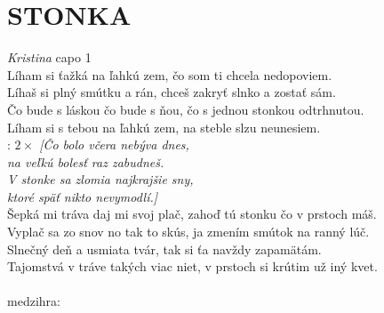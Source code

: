 \section*{\Huge STONKA}
\emph{Kristina} \hspace{12cm} capo 1\\

Líham si ťažká na ľahkú zem, 
čo som ti chcela nedopoviem.\\
Líhaš si plný smútku a rán, 
chceš zakryť slnko a zostať sám.\\

Čo bude s láskou čo bude s ňou,
čo s jednou stonkou odtrhnutou.\\
Líham si s tebou na ľahkú zem,
na steble slzu neunesiem.\\

\textregistered: \emph{$2\times$ [Čo bolo včera nebýva dnes,\\
na veľkú bolesť raz zabudneš.\\
V stonke sa zlomia najkrajšie sny,\\
ktoré späť nikto nevymodlí.]}\\

Šepká mi tráva daj mi svoj plač,
zahoď tú stonku čo v prstoch máš.\\
Vyplač sa zo snov no tak to skús,
ja zmením smútok na ranný lúč.\\

Slnečný deň a usmiata tvár,
tak si ťa navždy zapamätám.\\
Tajomstvá v tráve takých viac niet,
v prstoch si krútim už iný kvet.\\

\textregistered\\

medzihra:\\

\textregistered

\newpage
